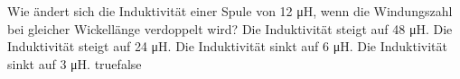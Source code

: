     {Wie ändert sich die Induktivität einer Spule von 12 μH, wenn die Windungszahl bei gleicher Wickellänge verdoppelt wird?}
    {Die Induktivität steigt auf 48 μH.}
    {Die Induktivität steigt auf 24 μH.}
    {Die Induktivität sinkt auf 6 μH.}
    {Die Induktivität sinkt auf 3 μH.}
    {true}{false}